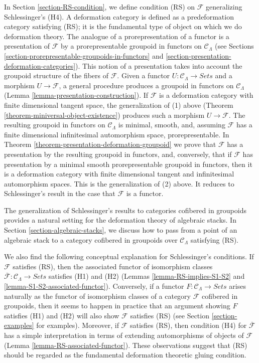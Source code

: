 \medskip \noindent
In
Section \ref{section-RS-condition},
we define condition (RS) on $\mathcal{F}$ generalizing Schlessinger's (H4).
A deformation
category is defined as a predeformation category satisfying (RS); it is the 
fundamental type of object on which we do deformation theory. The analogue of a 
prorepresentation of a functor is a presentation of $\mathcal{F}$ by a 
prorepresentable groupoid in functors on $\mathcal{C}_\Lambda$ (see 
Sections \ref{section-prorepresentable-groupoids-in-functors} and 
\ref{section-presentation-deformation-categories}).
This notion of a presentation takes into 
account the groupoid structure of the fibers of $\mathcal{F}$. Given a functor 
$U: \mathcal{C}_\Lambda \to \textit{Sets}$ and a morphism $U 
\to \mathcal{F}$, a general procedure produces a groupoid in functors on 
$\mathcal{C}_\Lambda$ (Lemma \ref{lemma-presentation-construction}).  If 
$\mathcal{F}$ is a deformation category with finite dimensional tangent space, 
the generalization of (1) above (Theorem 
\ref{theorem-miniversal-object-existence}) produces such a morphism $U 
\to \mathcal{F}$.  The resulting groupoid in functors on $\mathcal 
C_\Lambda$ is minimal, smooth, and, assuming $\mathcal{F}$ has a finite 
dimensional infinitesimal automorphism space, prorepresentable. In Theorem 
\ref{theorem-presentation-deformation-groupoid} we prove that $\mathcal{F}$ has 
a presentation by the resulting groupoid in functors, and, conversely, that if 
$\mathcal{F}$ has presentation by a minimal smooth prorepresentable groupoid in 
functors, then it is a deformation category with finite dimensional tangent and 
infinitesimal automorphism spaces. This is the generalization of (2) above. It 
reduces to Schlessinger's result in the case that $\mathcal{F}$ is a functor.

\medskip \noindent
The generalization of Schlessinger's results to categories cofibered in 
groupoids provides a natural setting for the deformation theory of algebraic 
stacks.  In Section \ref{section-algebraic-stacks}, we discuss how to pass from 
a point of an algebraic stack to a category cofibered in groupoids over 
$\mathcal{C}_\Lambda$ satisfying (RS).

\medskip \noindent
We also find the following conceptual explanation for Schlessinger's 
conditions.  If $\mathcal{F}$ satisfies (RS), then the associated functor of 
isomorphism classes $\overline{\mathcal{F}}: \mathcal{C}_\Lambda \to 
\textit{Sets}$ satisfies (H1) and (H2) (Lemmas 
\ref{lemma-RS-implies-S1-S2} and \ref{lemma-S1-S2-associated-functor}).  
Conversely, if a functor $F: \mathcal{C}_\Lambda \to 
\textit{Sets}$ arises naturally as the functor of isomorphism classes of 
a category $\mathcal{F}$ cofibered in groupoids, then it seems to happen in 
practice that an argument showing $F$ satisfies (H1) and (H2) will also show 
$\mathcal{F}$ satisfies (RS) (see Section \ref{section-examples} for
examples).  
Moreover, if $\mathcal{F}$ satisfies (RS), then condition (H4) for 
$\overline{\mathcal{F}}$ has a simple interpretation in terms of extending 
automorphisms of objects of $\mathcal{F}$ (Lemma 
\ref{lemma-RS-associated-functor}).  These observations suggest that (RS) 
should be regarded as the fundamental deformation theoretic gluing condition.




